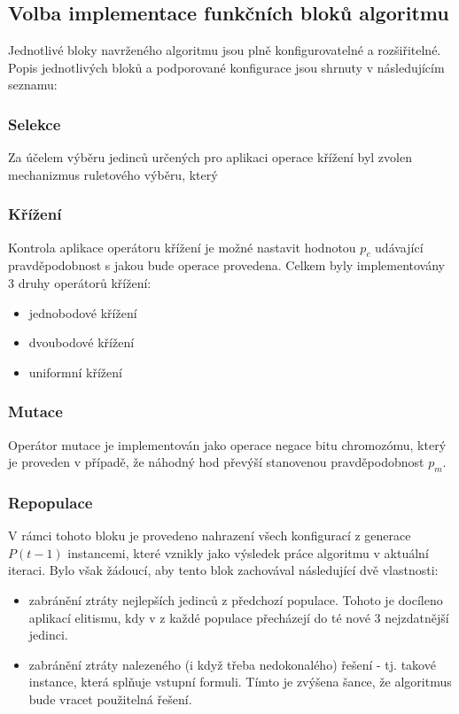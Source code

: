 \documentclass[12pt,oneside,a4paper]{article}
\begin{document}
\subsection{Volba implementace funkčních bloků algoritmu}

Jednotlivé bloky navrženého algoritmu jsou plně konfigurovatelné a rozšiřitelné. Popis jednotlivých bloků a podporované konfigurace jsou shrnuty v následujícím seznamu:

\subsubsection{Selekce}
Za účelem výběru jedinců určených pro aplikaci operace křížení byl zvolen mechanizmus ruletového výběru, který

\subsubsection{Křížení}

Kontrola aplikace operátoru křížení je možné nastavit hodnotou $p_c$ udávající pravděpodobnost s jakou bude operace provedena. Celkem byly implementovány 3 druhy operátorů křížení:
  \begin{itemize}
    \item jednobodové křížení
    \item dvoubodové křížení
    \item uniformní křížení
  \end{itemize}
\subsubsection{Mutace} Operátor mutace je implementován jako operace negace bitu chromozómu, který je proveden v případě, že náhodný hod převýší stanovenou pravděpodobnost $p_m$.

\subsubsection{Repopulace} 
V rámci tohoto bloku je provedeno nahrazení všech konfigurací z generace $P(t-1)$ instancemi, které vznikly jako výsledek práce algoritmu v aktuální iteraci. Bylo však žádoucí, aby tento blok zachovával následující dvě vlastnosti: 
  \begin{itemize}
    \item zabránění ztráty nejlepších jedinců z předchozí populace. Tohoto je docíleno aplikací elitismu, kdy v z každé populace přecházejí do té nové 3 nejzdatnější jedinci.
    \item zabránění ztráty nalezeného (i když třeba nedokonalého) řešení - tj. takové instance, která splňuje vstupní formuli. Tímto je zvýšena šance, že algoritmus bude vracet použitelná řešení.
  \end{itemize}
  
\end{document}
